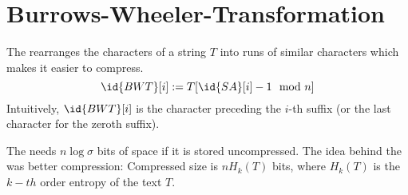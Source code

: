 \section{Burrows-Wheeler-Transformation}

\begin{Definition}
  The   rearranges the characters of a string $T$ into runs of similar characters which makes it easier to compress.
  \begin{equation}
    \id{BWT}[i] := T[\id{SA}[i] - 1 \mod n]
  \end{equation}
  Intuitively, $\id{BWT}[i]$ is the character preceding the $i$-th suffix (or the last character for the zeroth suffix).
\end{Definition}

The  needs $n\log\sigma$ bits of space if it is stored uncompressed. The idea behind the  was better compression: Compressed size is $nH_k(T)$ bits, where $H_k(T)$ is the $k-th$ order entropy of the text $T$.

